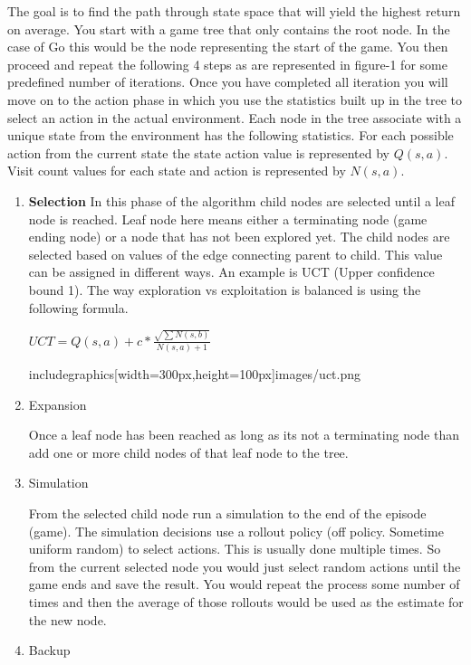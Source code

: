 \begin{search_page}
The goal is to find the path through state space that will yield the highest return on average. You start with a game tree that only contains the root node. In the case of Go this would be the node representing the start of the game. You then proceed and repeat the following 4 steps as are represented in figure-1 for some predefined number of iterations. Once you have completed all iteration you will move on to the action phase in which you use the statistics built up in the tree to select an action in the actual environment. Each node in the tree associate with a unique state from the environment has the following statistics. For each possible action from the current state the state action value is represented by $Q(s,a)$. Visit count values for each state and action is represented by $N(s,a)$.

\begin{enumerate}
    \item \textbf{Selection}
    In this phase of the algorithm child nodes are selected until a leaf node is reached. Leaf node here means either a terminating node (game ending node) or a node that has not been explored yet. The child nodes are selected based on values of the edge connecting parent to child. This value can be assigned in different ways. An example is UCT (Upper confidence bound 1). The way exploration vs exploitation is balanced is using the following formula. 
    
    $ UCT = Q(s,a) + c*\frac{\sqrt{\sum{N(s,b)}}}{N(s,a) + 1} $
    
    includegraphics[width=300px,height=100px]{images/uct.png}
    
    \item Expansion
    
    Once a leaf node has been reached as long as its not a terminating node than add one or more child nodes of that leaf node to the tree. 
    \item Simulation
    
    From the selected child node run a simulation to the end of the episode (game). The simulation decisions use a rollout policy (off policy. Sometime uniform random) to select actions. This is usually done multiple times. So from the current selected node you would just select random actions until the game ends and save the result. You would repeat the process some number of times and then the average of those rollouts would be used as the estimate for the new node. 
    
    \item Backup
    

\end{enumerate}
\end{search_page}
